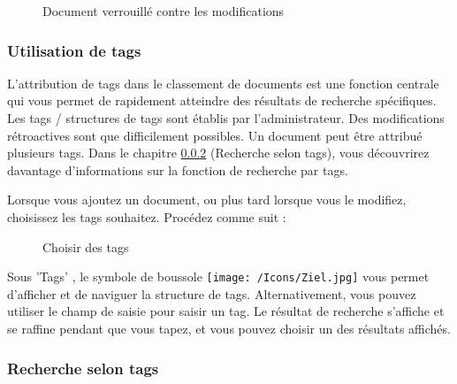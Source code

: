\begin{figure}[H]
\caption{Document verrouillé contre les modifications}
\end{figure}

\subsubsection{Utilisation de tags}
\label{bkm:Ref201801219}

L'attribution de tags dans le classement de documents est une fonction centrale qui vous permet de rapidement atteindre des résultats de recherche spécifiques. Les tags / structures de tags sont établis par l'administrateur. Des modifications rétroactives sont que difficilement possibles. Un document peut être attribué plusieurs tags. Dans le chapitre \ref{bkm:Ref442275849} (Recherche selon tags), vous découvrirez davantage d'informations sur la fonction de recherche par tags. \newline

\vspace{\baselineskip}

Lorsque vous ajoutez un document, ou plus tard lorsque vous le modifiez, choisissez les tags souhaitez. Procédez comme suit : 

\begin{figure}[H]
\caption{Choisir des tags}
\end{figure}

Sous 'Tags' , le symbole de boussole \texttt{[image: /Icons/Ziel.jpg]}  vous permet d'afficher et de naviguer la structure de tags. Alternativement, vous pouvez utiliser le champ de saisie  pour saisir un tag. Le résultat de recherche s'affiche et se raffine pendant que vous tapez, et vous pouvez choisir un des résultats affichés.



\subsubsection{Recherche selon tags}
\label{bkm:Ref442275849}


